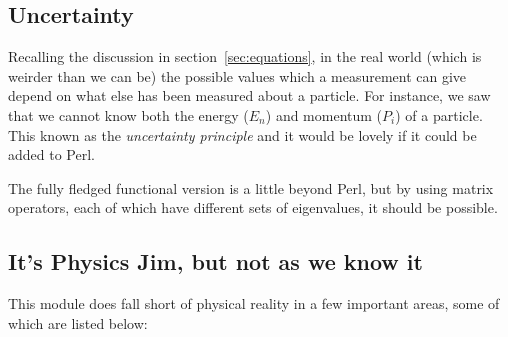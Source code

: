 \documentclass{article}      %
\begin{document}
\subsection{Uncertainty}

Recalling the discussion in section~\ref{sec:equations}, in the real
world (which is weirder than we can be) the possible values which a
measurement can give depend on what else has been measured about a
particle.  For instance, we saw that we cannot know both the energy
($E_n$) and momentum ($P_i$) of a particle.  This known as the
\emph{uncertainty principle} and it would be lovely if it could be
added to Perl.

The fully fledged functional version is a little beyond Perl, but
by using matrix operators, each of which have different sets of
eigenvalues, it should be possible.

\subsection{It's Physics Jim, but not as we know it}

This module does fall short of physical reality in a few important
areas, some of which are listed below:
\end{document}
